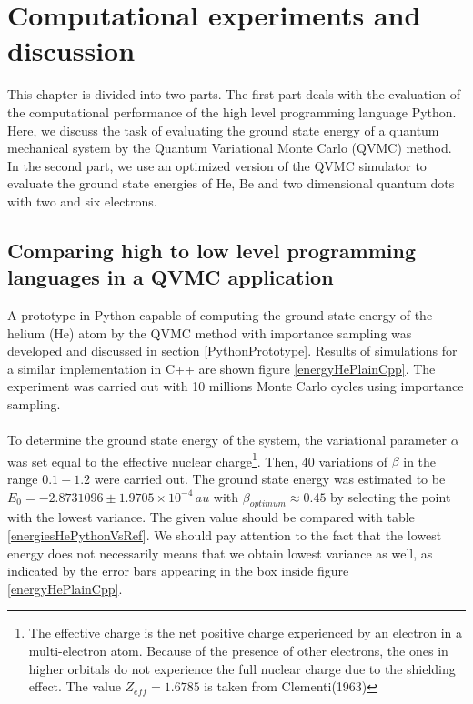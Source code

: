 \chapter{Computational experiments and discussion}\label{results}

This chapter is divided into two parts. The first part deals with the evaluation of the computational performance of the high level programming language Python. Here, we discuss the task of evaluating the ground state energy of a quantum mechanical system by the Quantum Variational Monte Carlo (QVMC) method. In the second part, we use an optimized version of the QVMC simulator to evaluate the ground state energies of He, Be and two dimensional quantum dots with two and six electrons.

\section{Comparing high to low level programming languages in a QVMC application}

A prototype in Python capable of computing the ground state energy of the helium (He) atom 
by the QVMC method with importance sampling was developed and discussed in section \ref{PythonPrototype}. Results of simulations for a similar implementation in C++ are shown figure \ref{energyHePlainCpp}. The experiment was carried out with 10 millions Monte Carlo cycles using importance sampling. \\
\\
To determine the ground state energy of the system, the variational parameter $\alpha$ was set equal to the effective nuclear charge\footnote{The effective charge is the net positive charge experienced by an electron in a multi-electron atom. Because of the presence of other electrons, the ones in higher orbitals do not experience the full nuclear charge due to the shielding effect. The value $Z_{eff} = 1.6785$ is taken from Clementi(1963)\cite{Clementi1963}}. Then, 40 variations of $\beta$ in the range $0.1-1.2$ were carried out. The ground state energy was estimated to be $E_0 = -2.8731096 \pm 1.9705\times10^{-4} \, au$ with $\beta_{optimum} \approx 0.45$ by selecting the point with the lowest variance. The given value should be compared with table \ref{energiesHePythonVsRef}. We should pay attention to the fact that the lowest energy does not necessarily means that we obtain lowest variance as well, as indicated by the error bars appearing in the box inside figure \ref{energyHePlainCpp}.\\


